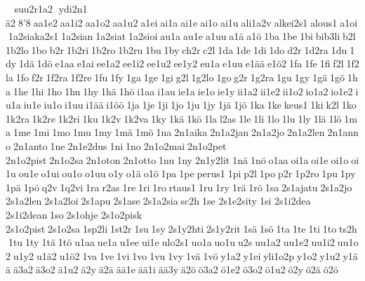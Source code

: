  	 suu2r1a2  ydi2n1  ä2 8'8 aa1e2 aa1i2 aa1o2 aa1u2 a1ei ai1a ai1e ai1o ai1u ali1a2v alkei2s1 alous1 a1oi 1a2siaka2s1 1a2sian 1a2siat 1a2sioi au1a au1e a1uu a1ä a1ö 1ba 1be 1bi bib3li b2l 1b2lo 1bo b2r 1b2ri 1b2ro 1b2ru 1bu 1by ch2r c2l 1da 1de 1di 1do d2r 1d2ra 1du 1dy 1dä 1dö e1aa e1ai ee1a2 ee1i2 ee1u2 ee1y2 eu1a e1uu e1ää e1ö2 1fa 1fe 1fi f2l 1f2la 1fo f2r 1f2ra 1f2re 1fu 1fy 1ga 1ge 1gi g2l 1g2lo 1go g2r 1g2ra 1gu 1gy 1gä 1gö 1ha 1he 1hi 1ho 1hu 1hy 1hä 1hö i1aa i1au ie1a ie1o ie1y ii1a2 ii1e2 ii1o2 io1a2 io1e2 iu1a iu1e iu1o i1uu i1ää i1öö 1ja 1je 1ji 1jo 1ju 1jy 1jä 1jö 1ka 1ke keus1 1ki k2l 1ko 1k2ra 1k2re 1k2ri 1ku 1k2v 1k2va 1ky 1kä 1kö 1la l2as 1le 1li 1lo 1lu 1ly 1lä 1lö 1ma 1me 1mi 1mo 1mu 1my 1mä 1mö 1na 2n1aika 2n1a2jan 2n1a2jo 2n1a2len 2n1anno 2n1anto 1ne 2n1e2dus 1ni 1no 2n1o2mai 2n1o2pet 	2n1o2pist 2n1o2sa 2n1oton 2n1otto 1nu 1ny 2n1y2lit 1nä 1nö o1aa oi1a oi1e oi1o oi1u ou1e o1ui ou1o o1uu o1y o1ä o1ö 1pa 1pe perus1 1pi p2l 1po p2r 1p2ro 1pu 1py 1pä 1pö q2v 1q2vi 1ra r2as 1re 1ri 1ro rtaus1 1ru 1ry 1rä 1rö 1sa 2s1ajatu 2s1a2jo 2s1a2len 2s1a2loi 2s1apu 2s1ase 2s1a2sia sc2h 1se 	2s1e2sity 1si 	2s1i2dea  	2s1i2dean 1so 2s1ohje 	2s1o2pisk 	2s1o2pist 2s1o2sa 1sp2li 1st2r 1su 1sy 2s1y2hti 2s1y2rit 1sä 1sö 1ta 1te 1ti 1to ts2h 1tu 1ty 1tä 1tö u1aa ue1a u1ee ui1e ulo2s1 uo1a uo1u u2s uu1a2 uu1e2 uu1i2 uu1o2 u1y2 u1ä2 u1ö2 1va 1ve 1vi 1vo 1vu 1vy 1vä 1vö y1a2 y1ei yli1o2p y1o2 y1u2 y1ää ä3a2 ä3o2 ä1u2 ä2y ä2ä ää1e ää1i ää3y ä2ö ö3a2 ö1e2 ö3o2 ö1u2 ö2y ö2ä ö2ö